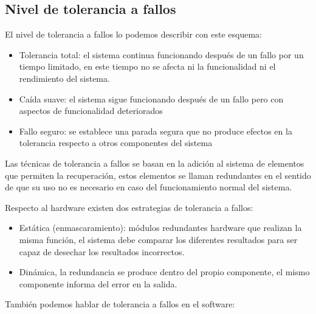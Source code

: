 \subsection{Nivel de tolerancia a fallos}

El nivel de tolerancia a fallos lo podemos describir con este esquema:

\begin{itemize}
	\item Tolerancia total: el sistema continua funcionando después de un
		fallo por un tiempo limitado, en este tiempo no se afecta ni la
		funcionalidad ni el rendimiento del sistema.
	\item Caída suave: el sistema sigue funcionando después de un fallo pero
		con aspectos de funcionalidad deteriorados
	\item Fallo seguro: se establece una parada segura que no produce
		efectos en la tolerancia respecto a otros componentes del
		sistema
\end{itemize}

Las técnicas de tolerancia a fallos se basan en la adición al sistema de
elementos que permiten la recuperación, estos elementos se llaman redundantes en
el sentido de que su uso no es necesario en caso del funcionamiento normal del
sistema.

Respecto al hardware existen dos estrategias de tolerancia a fallos:

\begin{itemize}
	\item Estática (enmascaramiento): módulos redundantes hardware que
		realizan la misma función, el sistema debe comparar los
		diferentes resultados para ser capaz de desechar los resultados
		incorrectos.
	\item Dinámica, la redundancia se produce dentro del propio componente,
		el mismo componente informa del error en la salida.
\end{itemize}

También podemos hablar de tolerancia a fallos en el software:

